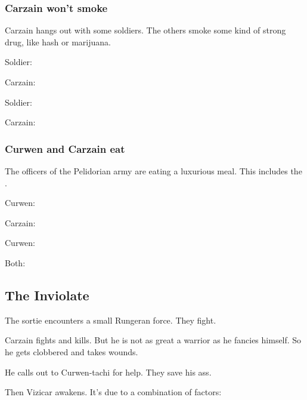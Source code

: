 \subsubsection{Carzain won't smoke}
Carzain hangs out with some soldiers. The others smoke some kind of strong drug, like hash or marijuana. 

\begin{prose}
  Soldier: 
  
  Carzain: 
  
  Soldier: 
  
  Carzain: 
\end{prose}





\subsubsection{Curwen and Carzain eat}
The officers of the Pelidorian army are eating a luxurious meal. This includes the \ishrah. 

Curwen: 

Carzain: 

Curwen: 

Both: 









\subsection{The \Caliph Inviolate}
The sortie encounters a small Rungeran force. They fight. 

Carzain fights and kills. 
But he is not as great a warrior as he fancies himself. 
So he gets clobbered and takes wounds. 

He calls out to Curwen-tachi for help. 
They save his ass. 

Then Vizicar awakens. 
It's due to a combination of factors: 

